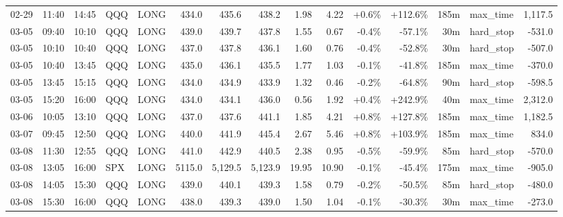 \documentclass[11pt,a4paper,twoside]{article}
\begin{document}
\begin{landscape}
\begin{center}
\begin{longtable}{>{\color{txtmain}}l l l l l r r r r r r r r >{\color{txtmain}}l r}
02-29 & 11:40 & 14:45 & QQQ & LONG & 434.0 & 435.6 & 438.2 & 1.98 & 4.22 & \textcolor{wingreen}{+0.6\%} & \textcolor{wingreen}{+112.6\%} & 185m & max\_time & \textcolor{wingreen}{1,117.5} \\
03-05 & 09:40 & 10:10 & QQQ & LONG & 439.0 & 439.7 & 437.8 & 1.55 & 0.67 & \textcolor{lossred}{-0.4\%} & \textcolor{lossred}{-57.1\%} & 30m & hard\_stop & \textcolor{lossred}{-531.0} \\
03-05 & 10:10 & 10:40 & QQQ & LONG & 437.0 & 437.8 & 436.1 & 1.60 & 0.76 & \textcolor{lossred}{-0.4\%} & \textcolor{lossred}{-52.8\%} & 30m & hard\_stop & \textcolor{lossred}{-507.0} \\
03-05 & 10:40 & 13:45 & QQQ & LONG & 435.0 & 436.1 & 435.5 & 1.77 & 1.03 & \textcolor{lossred}{-0.1\%} & \textcolor{lossred}{-41.8\%} & 185m & max\_time & \textcolor{lossred}{-370.0} \\
03-05 & 13:45 & 15:15 & QQQ & LONG & 434.0 & 434.9 & 433.9 & 1.32 & 0.46 & \textcolor{lossred}{-0.2\%} & \textcolor{lossred}{-64.8\%} & 90m & hard\_stop & \textcolor{lossred}{-598.5} \\
03-05 & 15:20 & 16:00 & QQQ & LONG & 434.0 & 434.1 & 436.0 & 0.56 & 1.92 & \textcolor{wingreen}{+0.4\%} & \textcolor{wingreen}{+242.9\%} & 40m & max\_time & \textcolor{wingreen}{2,312.0} \\
03-06 & 10:05 & 13:10 & QQQ & LONG & 437.0 & 437.6 & 441.1 & 1.85 & 4.21 & \textcolor{wingreen}{+0.8\%} & \textcolor{wingreen}{+127.8\%} & 185m & max\_time & \textcolor{wingreen}{1,182.5} \\
03-07 & 09:45 & 12:50 & QQQ & LONG & 440.0 & 441.9 & 445.4 & 2.67 & 5.46 & \textcolor{wingreen}{+0.8\%} & \textcolor{wingreen}{+103.9\%} & 185m & max\_time & \textcolor{wingreen}{834.0} \\
03-08 & 11:30 & 12:55 & QQQ & LONG & 441.0 & 442.9 & 440.5 & 2.38 & 0.95 & \textcolor{lossred}{-0.5\%} & \textcolor{lossred}{-59.9\%} & 85m & hard\_stop & \textcolor{lossred}{-570.0} \\
03-08 & 13:05 & 16:00 & SPX & LONG & 5115.0 & 5,129.5 & 5,123.9 & 19.95 & 10.90 & \textcolor{lossred}{-0.1\%} & \textcolor{lossred}{-45.4\%} & 175m & max\_time & \textcolor{lossred}{-905.0} \\
03-08 & 14:05 & 15:30 & QQQ & LONG & 439.0 & 440.1 & 439.3 & 1.58 & 0.79 & \textcolor{lossred}{-0.2\%} & \textcolor{lossred}{-50.5\%} & 85m & hard\_stop & \textcolor{lossred}{-480.0} \\
03-08 & 15:30 & 16:00 & QQQ & LONG & 438.0 & 439.3 & 439.0 & 1.50 & 1.04 & \textcolor{lossred}{-0.1\%} & \textcolor{lossred}{-30.3\%} & 30m & max\_time & \textcolor{lossred}{-273.0} \\

\end{longtable}
\end{center}
\end{landscape}
\end{document}
